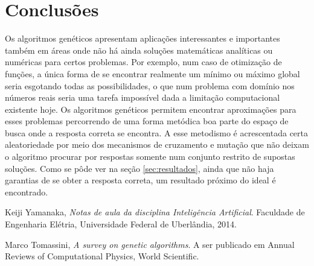 \documentclass[11pt]{article}
\begin{document}
\newpage
\section{Conclusões}

Os algoritmos genéticos apresentam aplicações interessantes e importantes também em áreas onde não há ainda soluções matemáticas analíticas ou numéricas para certos problemas. Por exemplo, num caso de otimização de funções, a única forma de se encontrar realmente um mínimo ou máximo global seria esgotando todas as possibilidades, o que num problema com domínio nos números reais seria uma tarefa impossível dada a limitação computacional existente hoje. Os algoritmos genéticos permitem encontrar aproximações para esses problemas percorrendo de uma forma metódica boa parte do espaço de busca onde a resposta correta se encontra. A esse metodismo é acrescentada certa aleatoriedade por meio dos mecanismos de cruzamento e mutação que não deixam o algoritmo procurar por respostas somente num conjunto restrito de supostas soluções. Como se pôde ver na seção \ref{sec:resultados}, ainda que não haja garantias de se obter a resposta correta, um resultado próximo do ideal é encontrado.

\newpage
\begin{thebibliography}{2}

  Keiji Yamanaka,
  \emph{Notas de aula da disciplina Inteligência Artificial}.
  Faculdade de Engenharia Elétria, Universidade Federal de Uberlândia, 2014.

  Marco Tomassini,
  \emph{A survey on genetic algorithms}. A ser publicado em Annual Reviews of Computational Physics, World Scientific.

\end{thebibliography}
\end{document}
